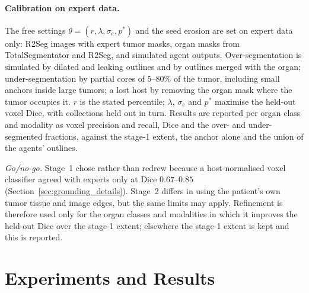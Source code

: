 \documentclass[fleqn,10pt]{olplainarticle}
\begin{document}
\paragraph{Calibration on expert data.}
\label{sec:stage2_calib}
The free settings $\theta=(r,\lambda,\sigma_e,p^\ast)$ and the seed erosion are set on expert data only: R2Seg images with
expert tumor masks, organ masks from TotalSegmentator and R2Seg, and simulated agent outputs. Over-segmentation is
simulated by dilated and leaking outlines and by outlines merged with the organ; under-segmentation by partial cores of
$5$--$80\%$ of the tumor, including small anchors inside large tumors; a lost host by removing the organ mask where the
tumor occupies it. $r$ is the stated percentile; $\lambda$, $\sigma_e$ and $p^\ast$ maximise the held-out voxel Dice,
with collections held out in turn. Results are reported per organ class and modality as voxel precision and recall, Dice
and the over- and under-segmented fractions, against the stage-1 extent, the anchor alone and the union of the agents'
outlines.

\emph{Go/no-go.} Stage~1 chose rather than redrew because a host-normalised voxel classifier agreed with experts only at
Dice $0.67$--$0.85$ (Section~\ref{sec:grounding_details}). Stage~2 differs in using the patient's own tumor tissue and
image edges, but the same limits may apply. Refinement is therefore used only for the organ classes and modalities in which
it improves the held-out Dice over the stage-1 extent; elsewhere the stage-1 extent is kept and this is reported.

\section{Experiments and Results}
\label{sec:results}
\end{document}

